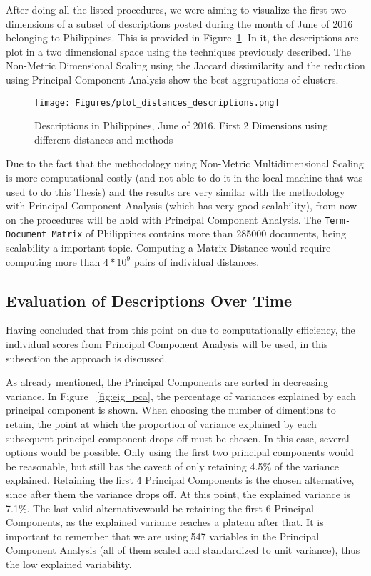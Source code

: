 After doing all the listed procedures, we were aiming to visualize the first two dimensions of a subset of descriptions posted during the month of June of 2016 belonging to Philippines. This is provided in Figure~\ref{Fig:distances_plot}. In it, the descriptions are plot in a two dimensional space using the techniques previously described. The Non-Metric Dimensional Scaling using the Jaccard dissimilarity and the reduction using Principal Component Analysis show the best aggrupations of clusters.

\begin{figure}[H]
\texttt{[image: Figures/plot\_distances\_descriptions.png]}
\caption{Descriptions in Philippines, June of 2016. First 2 Dimensions using different distances and methods}
\label{Fig:distances_plot}
\end{figure}

Due to the fact that the methodology using Non-Metric Multidimensional Scaling is more computational costly (and not able to do it in the local machine that was used to do this Thesis) and the results are very similar with the methodology with Principal Component Analysis (which has very good scalability), from now on the procedures will be hold with Principal Component Analysis. The \texttt{Term-Document Matrix} of Philippines contains more than 285000 documents, being scalability a important topic. Computing a Matrix Distance would require computing more than $4*10^9$ pairs of individual distances.

\subsection{Evaluation of Descriptions Over Time}
Having concluded that from this point on due to computationally efficiency, the individual scores from Principal Component Analysis will be used, in this subsection the approach is discussed.

As already mentioned, the Principal Components are sorted in decreasing variance. In Figure ~\ref{fig:eig_pca}, the percentage of variances explained by each principal component is shown. When choosing the number of dimentions to retain, the point at which the proportion of variance explained by each subsequent principal component drops off must be chosen. In this case, several options would be possible. Only using the first two principal components would be reasonable, but still has the caveat of only retaining 4.5\% of the variance explained. Retaining the first 4 Principal Components is the chosen alternative, since after them the variance drops off. At this point, the explained variance is 7.1\%. The last valid alternativewould be retaining the first 6 Principal Components, as the explained variance reaches a plateau after that. It is important to remember that we are using 547 variables in the Principal Component Analysis (all of them scaled and standardized to unit variance), thus the low explained variability.

